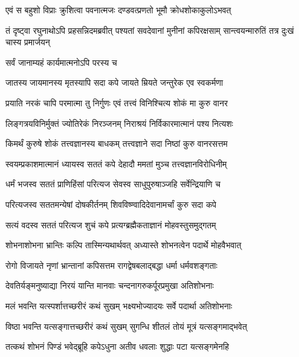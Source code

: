 
\twolineshloka
{एवं स बहुशो विप्राः क्रुशित्वा पवनात्मजः}
{दण्डवत्प्रणतो भूमौ क्रोधशोकाकुलोऽभवत्}%

\threelineshloka
{तं दृष्ट्वा रघुनाथोऽपि प्रहसन्निदमब्रवीत्}
{पश्यतां सवदेवानां मुनीनां कपिरक्षसाम्}
{सान्त्वयन्मारुतिं तत्र दुःखं चास्य प्रमार्जयन्}%


\onelineshloka
{सर्वं जानाम्यहं कार्यमात्मनोऽपि परस्य च}%

\twolineshloka
{जातस्य जायमानस्य मृतस्यापि सदा कपे}
{जायते म्रियते जन्तुरेक एव स्वकर्मणा} %

\twolineshloka
{प्रयाति नरकं चापि परमात्मा तु निर्गुणः}
{एवं तत्त्वं विनिश्चित्य शोकं मा कुरु वानर}%

\twolineshloka
{लिङ्गत्रयविनिर्मुक्तं ज्योतिरेकं निरञ्जनम्}
{निराश्रयं निर्विकारमात्मानं पश्य नित्यशः}%

\twolineshloka
{किमर्थं कुरुषे शोकं तत्त्वज्ञानस्य बाधकम्}
{तत्त्वज्ञाने सदा निष्ठां कुरु वानरसत्तम}%

\twolineshloka
{स्वयम्प्रकाशमात्मानं ध्यायस्व सततं कपे}
{देहादौ ममतां मुञ्च तत्त्वज्ञानविरोधिनीम्}%

\twolineshloka
{धर्मं भजस्व सततं प्राणिहिंसां परित्यज}
{सेवस्व साधुपुरुषाञ्जहि सर्वेन्द्रियाणि च}%

\twolineshloka
{परित्यजस्व सततमन्येषां दोषकीर्तनम्}
{शिवविष्ण्वादिदेवानामर्चां कुरु सदा कपे}%

\twolineshloka
{सत्यं वदस्व सततं परित्यज शुचं कपे}
{प्रत्यग्ब्रह्मैकताज्ञानं मोहवस्तुसमुद्गतम्}%

\twolineshloka
{शोभनाशोभना भ्रान्तिः कल्पि तास्मिन्यथार्थवत्}
{अध्यास्ते शोभनत्वेन पदार्थे मोहवैभवात्}%

\twolineshloka
{रोगो विजायते नृणां भ्रान्तानां कपिसत्तम}
{रागद्वेषबलाद्बद्धा धर्मा धर्मवशङ्गताः}%

\twolineshloka
{देवतिर्यङ्मनुष्याद्या निरयं यान्ति मानवाः}
{चन्दनागरुकर्पूरप्रमुखा अतिशोभनाः}%

\twolineshloka
{मलं भवन्ति यत्स्पर्शात्तच्छरीरं कथं सुखम्}
{भक्ष्यभोज्यादयः सर्वे पदार्था अतिशोभनाः}%

\twolineshloka
{विष्ठा भवन्ति यत्सङ्गात्तच्छरीरं कथं सुखम्}
{सुगन्धि शीतलं तोयं मूत्रं यत्सङ्गमाद्भवेत्}%

\twolineshloka
{तत्कथं शोभनं पिण्डं भवेद्ब्रूहि कपेऽधुना}
{अतीव धवलाः शुद्धाः पटा यत्सङ्गमेनहि}%

